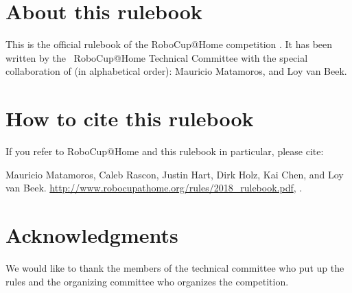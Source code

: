 


\section*{About this rulebook}
This is the official rulebook of the RoboCup@Home competition \YEAR.
It has been written by the \YEAR ~RoboCup@Home Technical Committee with the special collaboration of (in alphabetical order):
Mauricio Matamoros,
and
Loy van Beek.



\section*{How to cite this rulebook}
If you refer to RoboCup@Home and this rulebook in particular, please cite:

Mauricio Matamoros, Caleb Rascon, Justin Hart, Dirk Holz, Kai Chen, and Loy van Beek.
\url{http://www.robocupathome.org/rules/2018_rulebook.pdf}, \YEAR.

\begin{center}
\begin{minipage}{0.8\textwidth}
	\footnotesize%
	
\end{minipage}
\end{center}

\section*{Acknowledgments}
\label{sec:acknowledgments}
We would like to thank the members of the technical committee who put up the rules and the organizing committee who organizes the competition.

